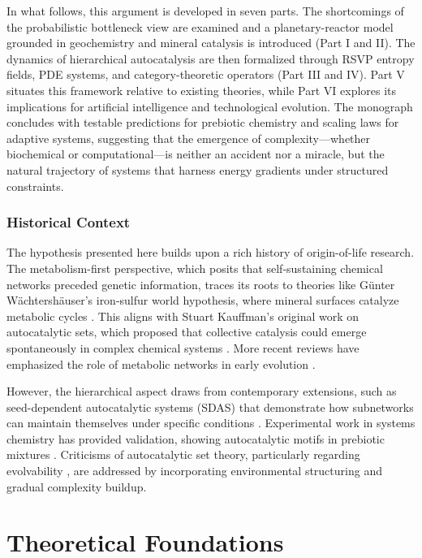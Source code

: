 \documentclass{book}
\begin{document}
In what follows, this argument is developed in seven parts. The shortcomings of the probabilistic bottleneck view are examined and a planetary-reactor model grounded in geochemistry and mineral catalysis is introduced (Part I and II). The dynamics of hierarchical autocatalysis are then formalized through RSVP entropy fields, PDE systems, and category-theoretic operators (Part III and IV). Part V situates this framework relative to existing theories, while Part VI explores its implications for artificial intelligence and technological evolution. The monograph concludes with testable predictions for prebiotic chemistry and scaling laws for adaptive systems, suggesting that the emergence of complexity—whether biochemical or computational—is neither an accident nor a miracle, but the natural trajectory of systems that harness energy gradients under structured constraints.

\section{Historical Context}
The hypothesis presented here builds upon a rich history of origin-of-life research. The metabolism-first perspective, which posits that self-sustaining chemical networks preceded genetic information, traces its roots to theories like Günter Wächtershäuser's iron-sulfur world hypothesis, where mineral surfaces catalyze metabolic cycles \citep{wachtershauser1988}. This aligns with Stuart Kauffman's original work on autocatalytic sets, which proposed that collective catalysis could emerge spontaneously in complex chemical systems \citep{kauffman1993}. More recent reviews have emphasized the role of metabolic networks in early evolution \citep{morowitz2002, martin2015}.

However, the hierarchical aspect draws from contemporary extensions, such as seed-dependent autocatalytic systems (SDAS) that demonstrate how subnetworks can maintain themselves under specific conditions \citep{peng2022}. Experimental work in systems chemistry has provided validation, showing autocatalytic motifs in prebiotic mixtures \citep{semenov2016, sokolskyi2024}. Criticisms of autocatalytic set theory, particularly regarding evolvability \citep{vasas2010}, are addressed by incorporating environmental structuring and gradual complexity buildup.

\part{Theoretical Foundations}
\end{document}
